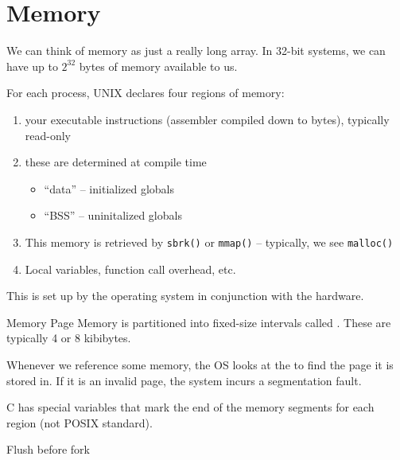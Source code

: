 \documentclass[code]{amznotes}
\begin{document}


\chapter{Memory}
We can think of memory as just a really long array. In 32-bit systems, we can have up to $2^{32}$ bytes of memory available to us.

For each process, UNIX declares four regions of memory:
\begin{enumerate}[noitemsep]
    \item {} your executable instructions (assembler compiled down to bytes), typically read-only
    \item {} these are determined at compile time
    \begin{itemize}[noitemsep]
        \item ``data'' -- initialized globals
        \item ``BSS'' -- uninitalized globals
    \end{itemize}
    \item {} This memory is retrieved by \texttt{sbrk()} or \texttt{mmap()} -- typically, we see \texttt{malloc()}
    \item {} Local variables, function call overhead, etc. 
\end{enumerate}
This is set up by the operating system in conjunction with the hardware.

\begin{dfnbox}{Memory Page}{}
Memory is partitioned into fixed-size intervals called . These are typically 4 or 8 kibibytes.
\end{dfnbox}

Whenever we reference some memory, the OS looks at the  to find the page it is stored in. If it is an invalid page, the system incurs a segmentation fault.

C has special variables that mark the end of the memory segments for each region (not POSIX standard).

\begin{notebox}
    Flush before fork
\end{notebox}

\amzindex
\end{document}
